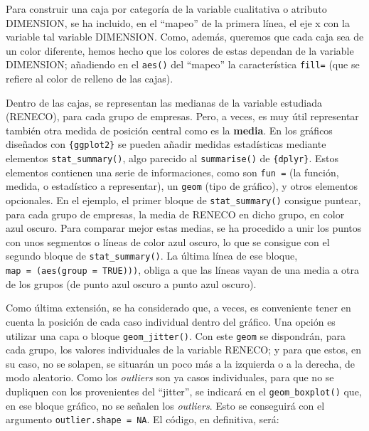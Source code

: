 \documentclass[
]{book}
\begin{document}
Para construir una caja por categoría de la variable cualitativa o atributo DIMENSION, se ha incluido, en el ``mapeo'' de la primera línea, el eje x con la variable tal variable DIMENSION. Como, además, queremos que cada caja sea de un color diferente, hemos hecho que los colores de estas dependan de la variable DIMENSION; añadiendo en el \texttt{aes()} del ``mapeo'' la característica \texttt{fill=} (que se refiere al color de relleno de las cajas).

Dentro de las cajas, se representan las medianas de la variable estudiada (RENECO), para cada grupo de empresas. Pero, a veces, es muy útil representar también otra medida de posición central como es la \textbf{media}. En los gráficos diseñados con \texttt{\{ggplot2\}} se pueden añadir medidas estadísticas mediante elementos \texttt{stat\_summary()}, algo parecido al \texttt{summarise()} de \texttt{\{dplyr\}}. Estos elementos contienen una serie de informaciones, como son \texttt{fun\ =} (la función, medida, o estadístico a representar), un \texttt{geom} (tipo de gráfico), y otros elementos opcionales. En el ejemplo, el primer bloque de \texttt{stat\_summary()} consigue puntear, para cada grupo de empresas, la media de RENECO en dicho grupo, en color azul oscuro. Para comparar mejor estas medias, se ha procedido a unir los puntos con unos segmentos o líneas de color azul oscuro, lo que se consigue con el segundo bloque de \texttt{stat\_summary()}. La última línea de ese bloque, \texttt{map\ =\ (aes(group\ =\ TRUE)))}, obliga a que las líneas vayan de una media a otra de los grupos (de punto azul oscuro a punto azul oscuro).

Como última extensión, se ha considerado que, a veces, es conveniente tener en cuenta la posición de cada caso individual dentro del gráfico. Una opción es utilizar una capa o bloque \texttt{geom\_jitter()}. Con este \texttt{geom} se dispondrán, para cada grupo, los valores individuales de la variable RENECO; y para que estos, en su caso, no se solapen, se situarán un poco más a la izquierda o a la derecha, de modo aleatorio. Como los \emph{outliers} son ya casos individuales, para que no se dupliquen con los provenientes del ``jitter'', se indicará en el \texttt{geom\_boxplot()} que, en ese bloque gráfico, no se señalen los \emph{outliers}. Esto se conseguirá con el argumento \texttt{outlier.shape\ =\ NA}. El código, en definitiva, será:
\end{document}
